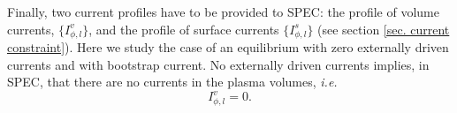 \documentclass[my_thesis.tex]{subfiles}
\begin{document}




Finally, two current profiles have to be provided to SPEC: the profile of volume currents, $\{I^v_{\phi,l}\}$, and the profile of surface currents $\{I^s_{\phi,l}\}$ (see section \ref{sec. current constraint}). Here we study the case of an equilibrium with zero externally driven currents and with bootstrap current. No externally driven currents implies, in SPEC, that there are no currents in the plasma volumes, \textit{i.e.}
\begin{equation}
	I^v_{\phi,l} = 0.\label{eq.volume current}
\end{equation}
	
\end{document}
